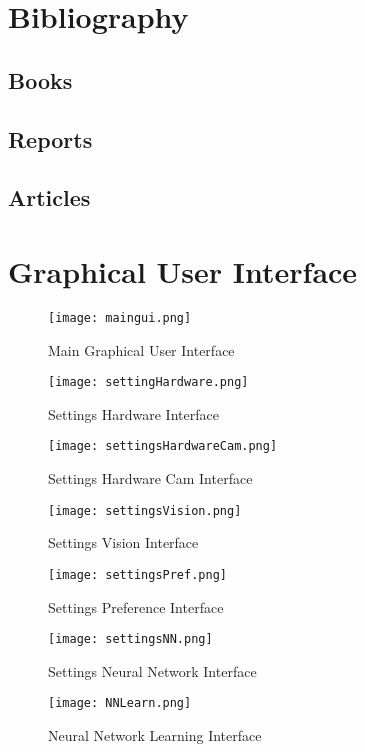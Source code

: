 \documentclass[11pt,fleqn,,a4paper,twoside,openright]{book}
\begin{document}
\chapter*{Bibliography}
\section*{Books}
\printbibliography[heading=bibempty,type=book]
\section*{Reports}
\printbibliography[heading=bibempty,type=report]
\section*{Articles}
\printbibliography[heading=bibempty,type=article]

\cleardoublepage
{}
\setlength{\columnsep}{0.75cm}
\printindex

\appendix
{}
\chapter{Graphical User Interface}
\begin{figure}[h]
	\texttt{[image: maingui.png]}
	\caption{Main Graphical User Interface}
\end{figure}
\begin{figure}[h]
	\texttt{[image: settingHardware.png]}
	\caption{Settings Hardware Interface}
\end{figure}
\begin{figure}[h]
	\texttt{[image: settingsHardwareCam.png]}
	\caption{Settings Hardware Cam Interface}
\end{figure}
\begin{figure}[h]
	\texttt{[image: settingsVision.png]}
	\caption{Settings Vision Interface}
\end{figure}
\begin{figure}[h]
	\texttt{[image: settingsPref.png]}
	\caption{Settings Preference Interface}
\end{figure}
\begin{figure}[h]
	\texttt{[image: settingsNN.png]}
	\caption{Settings Neural Network Interface}
\end{figure}
\begin{figure}[h]
	\texttt{[image: NNLearn.png]}
	\caption{Neural Network Learning Interface}
\end{figure}
\end{document}
